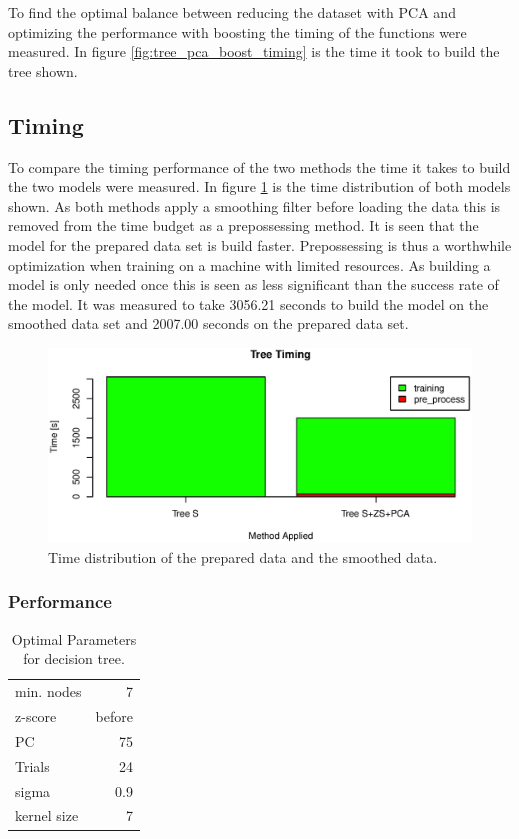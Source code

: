To find the optimal balance between reducing the dataset with PCA and optimizing the performance with boosting the timing of the functions were measured.
In figure \ref{fig:tree_pca_boost_timing} is the time it took to build the tree shown.

\subsection{Timing}
To compare the timing performance of the two methods the time it takes to build the two models were measured.
In figure \ref{fig:tree_time_distribution} is the time distribution of both models shown.
As both methods apply a smoothing filter before loading the data this is removed from the time budget as a prepossessing method.
It is seen that the model for the prepared data set is build faster.
Prepossessing is thus a worthwhile optimization when training on a machine with limited resources.
As building a model is only needed once this is seen as less significant than the success rate of the model.
It was measured to take 3056.21 seconds to build the model on the smoothed data set and 2007.00 seconds on the prepared data set.

\begin{figure}[H]
\centering
\includegraphics[width=\textwidth]{graphics/algo_compare_timing_tree}
\caption[Time distribution for decision tree.]{Time distribution of the prepared data and the smoothed data.}
\label{fig:tree_time_distribution}
\end{figure}

\subsubsection{Performance}

\begin{table}[h]
\centering
\begin{tabular}{lr}
min. nodes  & 7      \\
z-score     & before \\
PC          & 75     \\
Trials      & 24     \\
sigma       & 0.9    \\
kernel size & 7      \\
\end{tabular}
\caption{Optimal Parameters for decision tree.}
\label{tb:tree_simply_the_best_parameters}
\end{table}

